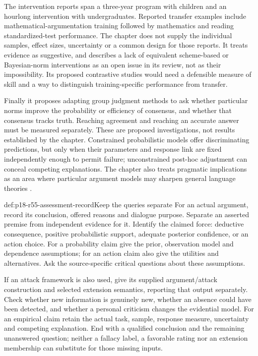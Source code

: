 The intervention reports span a three-year program with children and
an hourlong intervention with undergraduates. Reported transfer examples
include mathematical-argumentation training followed by mathematics and
reading standardized-test performance. The
chapter does not supply the individual samples, effect sizes, uncertainty
or a common design for those reports. It treats evidence as suggestive,
and describes a lack of equivalent scheme-based or Bayesian-norm
interventions as an open issue in its review, not as their impossibility.
Its proposed contrastive studies would need a defensible measure of skill
and a way to distinguish training-specific performance from transfer.

Finally it proposes adapting group judgment methods to ask whether
particular norms improve the probability or efficiency of consensus,
and whether that consensus tracks truth. Reaching agreement and reaching
an accurate answer must be measured separately. These are proposed
investigations, not results established by the chapter. Constrained
probabilistic models offer discriminating predictions, but only when
their parameters and response link are fixed independently enough to
permit failure; unconstrained post-hoc adjustment can conceal competing
explanations. The chapter also treats pragmatic implications as an area
where particular argument models may sharpen general language theories
\cite[p.~364]{HahnCollins2021ArgumentationTheory}.

\begin{hbmethod}{def:p18-r55-assessment-record}{Keep the queries separate}
For an actual argument, record its conclusion, offered reasons and
dialogue purpose. Separate an asserted premise from independent evidence
for it. Identify the claimed force: deductive consequence, positive
probabilistic support, adequate posterior confidence, or an action choice.
For a probability claim give the prior, observation model and dependence
assumptions; for an action claim also give the utilities and alternatives.
Ask the source-specific critical questions about these assumptions.

If an attack framework is also used, give its supplied argument/attack
construction and selected extension semantics, reporting that output
separately. Check whether new information is genuinely new, whether an
absence could have been detected, and whether a personal criticism changes
the evidential model. For an empirical claim retain the actual task,
sample, response measure, uncertainty and competing explanation.
End with a qualified conclusion and the remaining unanswered question;
neither a fallacy label, a favorable rating nor an extension membership
can substitute for those missing inputs.
\end{hbmethod}

